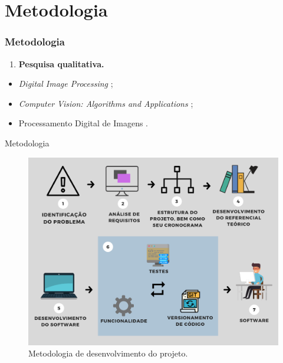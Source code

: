 \section{Metodologia}
\begin{frame}
\frametitle{Metodologia}
\label{metodologia}

\begin{enumerate}
    \item \textbf{Pesquisa qualitativa.}
\end{enumerate}


\begin{itemize}
    \item \textit{Digital Image Processing} \cite{GONZALEZ2002};
    \item \textit{Computer Vision: Algorithms and Applications} \cite{SZELISKI2010};
    \item Processamento Digital de Imagens \cite{FILHO1999}.
\end{itemize}
\end{frame}

\begin{frame}{Metodologia}
\begin{figure}
    \centering
    \caption{\label{fig_metodologia-desenvolvimento-tcc}Metodologia de desenvolvimento do projeto.}
    \includegraphics[scale=0.3]{04-SLIDE_METODOLOGIA/metodologia-desenvolvimento-tcc.png}
\end{figure}
\end{frame}